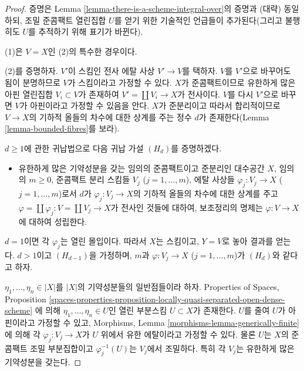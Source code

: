 \begin{proof}
증명은 Lemma \ref{lemma-there-is-a-scheme-integral-over}의 증명과
(대략) 동일하되, 조밀 준콤팩트 열린집합 $U$를 얻기 위한 기술적인
언급들이 추가된다(그리고 불행히도 $U$를 추적하기 위해 표기가 바뀐다).

\medskip\noindent
(1)은 $V = X$인 (2)의 특수한 경우이다.

\medskip\noindent
(2)를 증명하자. $V'$이 스킴인 전사 에탈 사상 $V' \to V$를 택하자.
$V$를 $V'$으로 바꾸어도 됨이 분명하므로 $V$가 스킴이라고 가정할
수 있다. $X$가 준콤팩트이므로 유한하게 많은 아핀 열린집합
$V_i \subset V$가 존재하여 $V' = \coprod V_i \to X$가 전사이다.
$V$를 다시 $V'$으로 바꾸면 $V$가 아핀이라고 가정할 수 있음을 안다.
$X$가 준분리이고 따라서 합리적이므로 $V \to X$의 기하적 올들의
차수에 대한 상계를 주는 정수 $d$가 존재한다(Lemma
\ref{lemma-bounded-fibres}를 보라).

\medskip\noindent
$d \geq 1$에 관한 귀납법으로 다음 귀납 가설 $(H_d)$를 증명하겠다.
\begin{itemize}
\item 유한하게 많은 기약성분을 갖는 임의의 준콤팩트이고 준분리인
대수공간 $X$, 임의의 $m \geq 0$, 준콤팩트 분리 스킴들
$V_j$ ($j = 1, \ldots, m$), 에탈 사상들
$\varphi_j : V_j \to X$ ($j = 1, \ldots, m$)로서
$d$가 $\varphi_j : V_j\to X$의 기하적 올들의 차수에 대한 상계를
주고 $\varphi = \coprod \varphi_j : V = \coprod V_j \to X$가
전사인 것들에 대하여, 보조정리의 명제는 $\varphi : V \to X$에
대하여 성립한다.
\end{itemize}
$d = 1$이면 각 $\varphi_j$는 열린 몰입이다. 따라서 $X$는 스킴이고,
$Y = V$로 놓아 결과를 얻는다.
$d > 1$이고 $(H_{d - 1})$을 가정하며, $m$과
$\varphi : V_j \to X$ ($j = 1, \ldots, m$)가 $(H_d)$와 같다고 하자.

\medskip\noindent
$\eta_1, \ldots, \eta_n \in |X|$를 $|X|$의 기약성분들의 일반점들이라
하자. Properties of Spaces, Proposition
\ref{spaces-properties-proposition-locally-quasi-separated-open-dense-scheme}
에 의해 $\eta_1, \ldots, \eta_n \in U$인 열린 부분스킴
$U \subset X$가 존재한다. $U$를 줄여 $U$가 아핀이라고 가정할 수 있고,
Morphisms, Lemma \ref{morphisms-lemma-generically-finite}에 의해
각 $\varphi_j : V_j \to X$가 $U$ 위에서 유한 에탈이라고 가정할 수
있다. 물론 $U$는 $X$의 준콤팩트 조밀 부분집합이고
$\varphi_j^{-1}(U)$는 $V_j$에서 조밀하다. 특히 각 $V_j$는
유한하게 많은 기약성분을 갖는다.


\end{proof}
